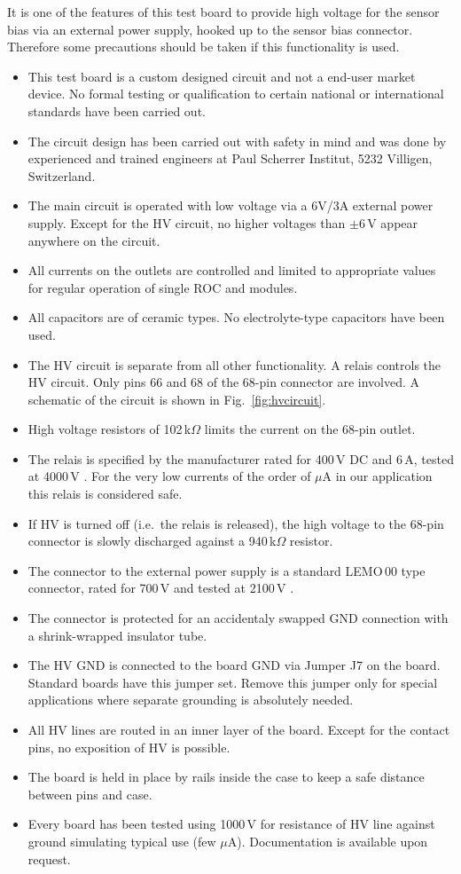 It is one of the features of this test board to provide high voltage for the sensor bias via an external power supply, hooked up to the sensor bias connector. Therefore some precautions should be taken if this functionality is used.
\begin{itemize}
    \item This test board is a custom designed circuit and not a end-user market device. No formal testing or qualification to certain national or international standards have been carried out.
    \item The circuit design has been carried out with safety in mind and was done by experienced and trained engineers at Paul Scherrer Institut, 5232 Villigen, Switzerland.
    \item The main circuit is operated with low voltage via a 6V/3A external power supply. Except for the HV circuit, no higher voltages than $\pm$6\,V appear anywhere on the circuit.
    \item All currents on the outlets are controlled and limited to appropriate values for regular operation of single ROC and modules.
    \item All capacitors are of ceramic types. No electrolyte-type capacitors have been used.
    \item The HV circuit is separate from all other functionality. A relais controls the HV circuit. Only pins 66 and 68 of the 68-pin connector are involved. A schematic of the circuit is shown in Fig.~\ref{fig:hvcircuit}.
    \item High voltage resistors of 102\,k$\Omega$ limits the current on the 68-pin outlet.
    \item The relais is specified by the manufacturer rated for 400\,V DC and 6\,A, tested at 4000\,V \cite{finderRelais}. For the very low currents of the order of $\mu$A in our application this relais is considered safe.
    \item If HV is turned off (i.e.~the relais is released), the high voltage to the 68-pin connector is slowly discharged against a 940\,k$\Omega$ resistor.
    \item The connector to the external power supply is a standard LEMO\,00 type connector, rated for 700\,V and tested at 2100\,V \cite{lemoConnector}.
    \item The connector is protected for an accidentaly swapped GND connection with a shrink-wrapped insulator tube.
    \item The HV GND is connected to the board GND via Jumper J7 on the board. Standard boards have this jumper set. Remove this jumper only for special applications where separate grounding is absolutely needed.
    \item All HV lines are routed in an inner layer of the board. Except for the contact pins, no exposition of HV is possible.
    \item The board is held in place by rails inside the case to keep a safe distance between pins and case.
    \item Every board has been tested using 1000\,V for resistance of HV line against ground simulating typical use (few $\mu$A). Documentation is available upon request.
\end{itemize}

